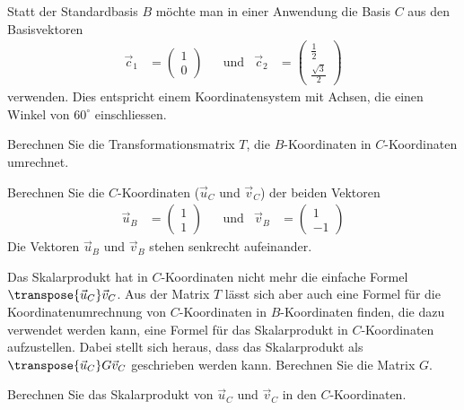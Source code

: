Statt der Standardbasis $B$ möchte man in einer Anwendung die Basis
$C$ aus den Basisvektoren
\[
\begin{aligned}
\vec c_1
&=
\begin{pmatrix}1\\0\end{pmatrix}
&
&\text{und}
&
\vec c_2
&=
\begin{pmatrix}\frac12\\\frac{\sqrt{3}}2\end{pmatrix}
\end{aligned}
\]
verwenden.
Dies entspricht einem Koordinatensystem mit Achsen, die einen Winkel
von $60^\circ$ ein\-schliessen.
\begin{teilaufgaben}
\item
Berechnen Sie die Transformationsmatrix $T$, die $B$-Koordinaten
in $C$-Koordinaten umrechnet.
\item
Berechnen Sie die $C$-Koordinaten ($\vec u_C$ und $\vec v_C$) der beiden Vektoren
\[
\begin{aligned}
\vec u_B&=\begin{pmatrix}1\\1\end{pmatrix}
&&\text{und}&
\vec v_B&=\begin{pmatrix}1\\-1\end{pmatrix}
\end{aligned}
\]
Die Vektoren $\vec u_B$ und $\vec v_B$ stehen senkrecht aufeinander.
\item
Das Skalarprodukt hat in $C$-Koordinaten nicht mehr die einfache
Formel $\transpose{\vec{u}_C} \vec v_C$.
Aus der Matrix $T$ lässt sich aber auch eine Formel für die
Koordinatenumrechnung von $C$-Koordinaten in $B$-Koordinaten finden,
die dazu verwendet werden kann, eine Formel für das Skalarprodukt in
$C$-Koordinaten aufzustellen.
Dabei stellt sich heraus, dass das Skalarprodukt
als $\transpose{\vec{u}_C}G\vec v_C$ geschrieben werden kann.
Berechnen Sie die Matrix $G$.
\item 
Berechnen Sie das Skalarprodukt von $\vec u_C$ und $\vec v_C$ in den $C$-Koordinaten.
\end{teilaufgaben}


